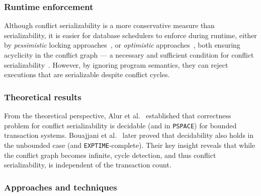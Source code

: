 
\subsubsection{Runtime enforcement}
Although conflict serializability is a more conservative measure than 
serializability, it is easier for database schedulers to enforce during 
runtime, either by \textit{pessimistic} locking approaches~\cite{BeHaGo87}, or 
\textit{optimistic} approaches~\cite{KuRo81, BuMo06}, both ensuring  acyclicity in the conflict graph --- a necessary and 
sufficient condition for conflict serializability~\cite{SiMa10}. 
However, by ignoring program semantics, they can reject executions that are serializable despite conflict cycles.

%
%

\subsubsection{Theoretical results}
From the theoretical perspective, Alur et al.~\cite{AlMcPe96} established that 
correctness problem for conflict serializability is decidable (and in 
\texttt{PSPACE}) 
for bounded transaction systems. Bouajjani et al.~\cite{BoEmEnHa13} later 
proved that decidability also holds in the unbounded case (and 
\texttt{EXPTIME}-complete). Their key insight reveals that while the conflict 
graph 
becomes infinite, cycle detection, and thus conflict serializability, is 
independent of the transaction count. 
%
%

\subsubsection{Approaches and techniques}

